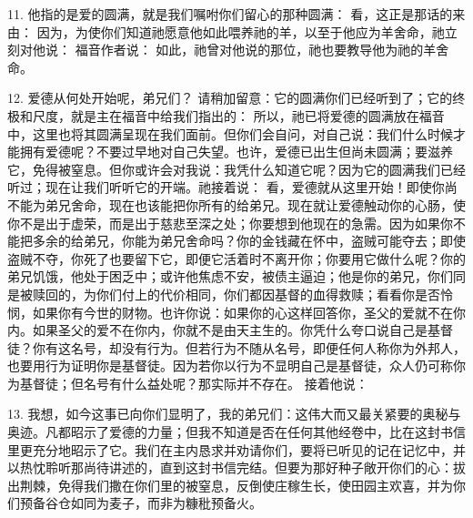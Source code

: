 11.  他指的是爱的圆满，就是我们嘱咐你们留心的那种圆满： 看，这正是那话的来由： 因为，为使你们知道祂愿意他如此喂养祂的羊，以至于他应为羊舍命，祂立刻对他说： 福音作者说： 如此，祂曾对他说的那位，祂也要教导他为祂的羊舍命。\par

12. 爱德从何处开始呢，弟兄们？ 请稍加留意：它的圆满你们已经听到了；它的终极和尺度，就是主在福音中给我们指出的： 所以，祂已将爱德的圆满放在福音中，这里也将其圆满呈现在我们面前。但你们会自问，对自己说：我们什么时候才能拥有爱德呢？不要过早地对自己失望。也许，爱德已出生但尚未圆满；要滋养它，免得被窒息。但你或许会对我说：我凭什么知道它呢？因为它的圆满我们已经听过；现在让我们听听它的开端。祂接着说： 看，爱德就从这里开始！即使你尚不能为弟兄舍命，现在也该能把你所有的给弟兄。现在就让爱德触动你的心肠，使你不是出于虚荣，而是出于慈悲至深之处；你要想到他现在的急需。因为如果你不能把多余的给弟兄，你能为弟兄舍命吗？你的金钱藏在怀中，盗贼可能夺去；即使盗贼不夺，你死了也要留下它，即便它活着时不离开你；你要用它做什么呢？你的弟兄饥饿，他处于困乏中；或许他焦虑不安，被债主逼迫；他是你的弟兄，你们同是被赎回的，为你们付上的代价相同，你们都因基督的血得救赎；看看你是否怜悯，如果你有今世的财物。也许你说：如果你的心这样回答你，圣父的爱就不在你内。如果圣父的爱不在你内，你就不是由天主生的。你凭什么夸口说自己是基督徒？你有这名号，却没有行为。但若行为不随从名号，即便任何人称你为外邦人，也要用行为证明你是基督徒。因为若你以行为不显明自己是基督徒，众人仍可称你为基督徒；但名号有什么益处呢？那实际并不存在。 接着他说：\par

13. 我想，如今这事已向你们显明了，我的弟兄们：这伟大而又最关紧要的奥秘与奥迹。凡都昭示了爱德的力量；但我不知道是否在任何其他经卷中，比在这封书信里更充分地昭示了它。我们在主内恳求并劝请你们，要将已听见的记在记忆中，并以热忱聆听那尚待讲述的，直到这封书信完结。但要为那好种子敞开你们的心：拔出荆棘，免得我们撒在你们里的被窒息，反倒使庄稼生长，使田园主欢喜，并为你们预备谷仓如同为麦子，而非为糠秕预备火。\par

